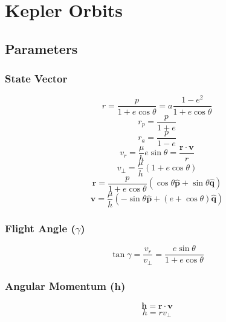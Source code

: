 \section{Kepler Orbits}

\subsection{Parameters}

\subsubsection{State Vector}
\begin{equation}
    r = \frac{p}{1+e\cos{\theta}} = a\frac{1-e^2}{1+e\cos{\theta}}
\end{equation}
\begin{equation}
    r_{p} = \frac{p}{1+e}
\end{equation}
\begin{equation}
    r_{a} = \frac{p}{1-e}
\end{equation}
\begin{equation}
    v_r = \frac{\mu}{h}e\sin{\theta} = \frac{\mathbf{r}\cdot\mathbf{v}}{r}
\end{equation}
\begin{equation}
    v_{\bot} = \frac{\mu}{h}\left(1+e\cos{\theta}\right)
\end{equation}
\begin{equation}
    \mathbf{r} = \frac{p}{1+e\cos{\theta}}\left(\cos{\theta}\hat{\mathbf{p}} + \sin{\theta}\hat{\mathbf{q}}\right)
\end{equation}
\begin{equation}
    \mathbf{v} = \frac{\mu}{h}\left(-\sin{\theta}\hat{\mathbf{p}} + \left(e+\cos{\theta}\right)\hat{\mathbf{q}}\right)
\end{equation}


\subsubsection{Flight Angle ($\gamma$)}
\begin{equation}
    \tan{\gamma}=\frac{v_r}{v_{\bot}}=\frac{e\sin{\theta}}{1+e\cos{\theta}}
\end{equation}


\subsubsection{Angular Momentum ($\mathbf{h}$)}
\begin{equation}
    \mathbf{h} = \mathbf{r} \cdot \mathbf{v}
\end{equation}
\begin{equation}
    h = rv_{\bot}
\end{equation}


